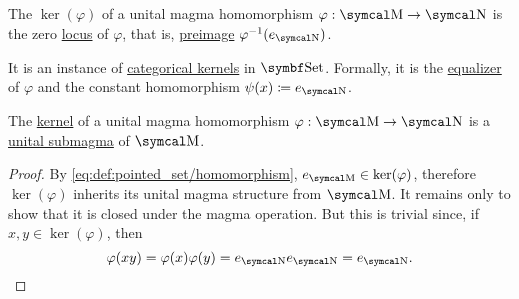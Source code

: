 \begin{definition}\label{def:unital_magma_kernel}
  The  \( \ker(\varphi) \) of a unital magma homomorphism \( \varphi: \CM \to \CN \) is the zero \hyperref[def:zero_locus]{locus} of \( \varphi \), that is, \hyperref[def:function/preimage]{preimage} \( \varphi^{-1}(e_{\CN}) \).

  It is an instance of \hyperref[def:categorical_kernel]{categorical kernels} in \hyperref[def:category_of_sets]{\( \Cat{Set} \)}. Formally, it is the \hyperref[thm:set_categorical_limits/equalizer]{equalizer} of \( \varphi \) and the constant homomorphism \( \psi(x) \coloneqq e_{\CN} \).
\end{definition}

\begin{proposition}\label{thm:unital_magma_kernel_is_submagma}
  The \hyperref[def:unital_magma_kernel]{kernel} of a unital magma homomorphism \( \varphi: \CM \to \CN \) is a \hyperref[def:first_order_substructure]{unital submagma} of \( \CM \).
\end{proposition}
\begin{proof}
  By \eqref{eq:def:pointed_set/homomorphism}, \( e_{\CM} \in \ker(\varphi) \), therefore \( \ker(\varphi) \) inherits its unital magma structure from \( \CM \). It remains only to show that it is closed under the magma operation. But this is trivial since, if \( x, y \in \ker(\varphi) \), then
  \begin{equation*}
    \varphi(xy) = \varphi(x) \varphi(y) = e_{\CN} e_{\CN} = e_{\CN}.
  \end{equation*}
\end{proof}
